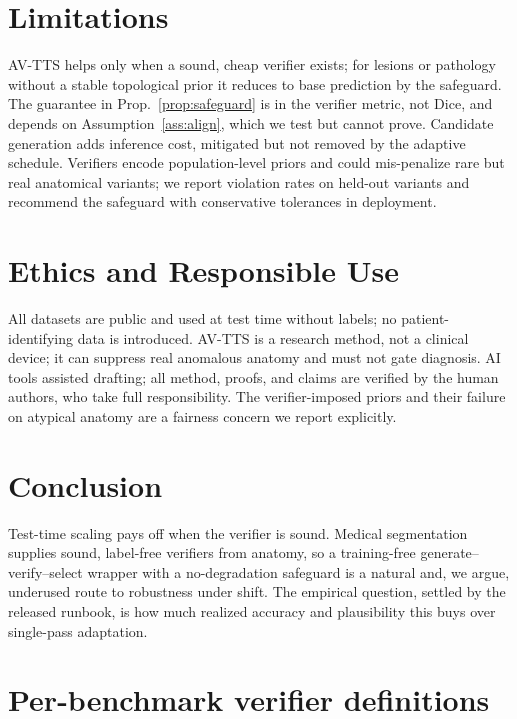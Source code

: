 \documentclass[10pt,twocolumn]{article}
\begin{document}
\section{Limitations}
AV-TTS helps only when a sound, cheap verifier exists; for lesions or pathology without a stable topological prior it reduces to base prediction by the safeguard. The guarantee in Prop.~\ref{prop:safeguard} is in the verifier metric, not Dice, and depends on Assumption~\ref{ass:align}, which we test but cannot prove. Candidate generation adds inference cost, mitigated but not removed by the adaptive schedule. Verifiers encode population-level priors and could mis-penalize rare but real anatomical variants; we report violation rates on held-out variants and recommend the safeguard with conservative tolerances in deployment.

\section*{Ethics and Responsible Use}
All datasets are public and used at test time without labels; no patient-identifying data is introduced. AV-TTS is a research method, not a clinical device; it can suppress real anomalous anatomy and must not gate diagnosis. AI tools assisted drafting; all method, proofs, and claims are verified by the human authors, who take full responsibility. The verifier-imposed priors and their failure on atypical anatomy are a fairness concern we report explicitly.

\section{Conclusion}
Test-time scaling pays off when the verifier is sound. Medical segmentation supplies sound, label-free verifiers from anatomy, so a training-free generate--verify--select wrapper with a no-degradation safeguard is a natural and, we argue, underused route to robustness under shift. The empirical question, settled by the released runbook, is how much realized accuracy and plausibility this buys over single-pass adaptation.




\appendix
\section{Per-benchmark verifier definitions}\label{app:verifiers}
\end{document}
